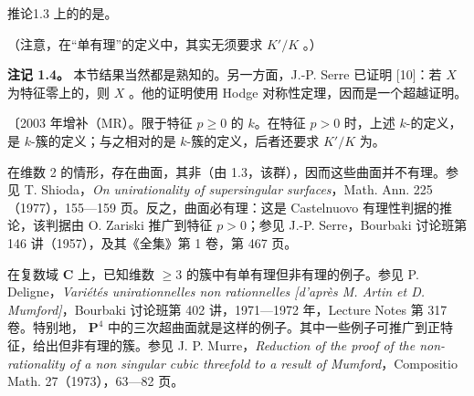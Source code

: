 \begin{SGAresult}{推论}{1.3}
上的的是。
\end{SGAresult}
（注意，在“单有理”的定义中，其实无须要求 $K'/K$ 。）

\textbf{注记 1.4。} 本节结果当然都是熟知的。另一方面，J.-P. Serre 已证明 [10]：若 $X$ 为特征零上的，则 $X$ 。他的证明使用 Hodge 对称性定理，因而是一个超越证明。

〔2003 年增补（MR）。限于特征 $p\geq0$ 的 $k$。在特征 $p>0$ 时，上述 $k$-的定义，是 $k$-簇的定义；与之相对的是 $k$-簇的定义，后者还要求 $K'/K$ 为。

在维数 2 的情形，存在曲面，其非（由 1.3，该群），因而这些曲面并不有理。参见 T. Shioda，\textit{On unirationality of supersingular surfaces}，Math. Ann. 225（1977），155—159 页。反之，曲面必有理：这是 Castelnuovo 有理性判据的推论，该判据由 O. Zariski 推广到特征 $p>0$；参见 J.-P. Serre，Bourbaki 讨论班第 146 讲（1957），及其《全集》第 1 卷，第 467 页。

在复数域 $\mathbf C$ 上，已知维数 $\geq3$ 的簇中有单有理但非有理的例子。参见 P. Deligne，\textit{Variétés unirationnelles non rationnelles [d'après M. Artin et D. Mumford]}，Bourbaki 讨论班第 402 讲，1971—1972 年，Lecture Notes 第 317 卷。特别地， $\mathbf P^4$ 中的三次超曲面就是这样的例子。其中一些例子可推广到正特征，给出但非有理的簇。参见 J. P. Murre，\textit{Reduction of the proof of the non-rationality of a non singular cubic threefold to a result of Mumford}，Compositio Math. 27（1973），63—82 页。

